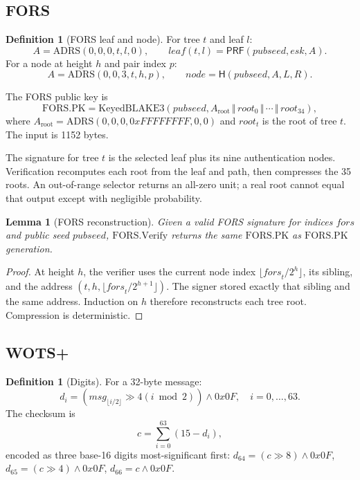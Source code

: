 \documentclass[11pt,a4paper]{article}
\theoremstyle{plain}
\newtheorem{lemma}[theorem]{Lemma}
\theoremstyle{definition}
\newtheorem{definition}[theorem]{Definition}
\theoremstyle{remark}
\newcommand{\concat}{\,\Vert\,}
\newcommand{\Hash}{\mathsf{H}}
\newcommand{\PRF}{\mathsf{PRF}}
\begin{document}
\subsection{FORS}

\begin{definition}[FORS leaf and node]
For tree $t$ and leaf $l$:
\[
 A=\mathrm{ADRS}(0,0,0,t,l,0),\qquad
 \mathit{leaf}(t,l)=\PRF(\mathit{pubseed},\mathit{esk},A).
\]
For a node at height $h$ and pair index $p$:
\[
 A=\mathrm{ADRS}(0,0,3,t,h,p),\qquad
 \mathit{node}=\Hash(\mathit{pubseed},A,L,R).
\]
\end{definition}

The FORS public key is
\[
 \mathrm{FORS.PK}=\mathrm{KeyedBLAKE3}(\mathit{pubseed},
 A_{\mathrm{root}}\concat\mathit{root}_0\concat\cdots
 \concat\mathit{root}_{34}),
\]
where $A_{\mathrm{root}}=\mathrm{ADRS}(0,0,0,0xFFFFFFFF,0,0)$ and
$\mathit{root}_t$ is the root of tree $t$.  The input is 1152 bytes.

The signature for tree $t$ is the selected leaf plus its nine
authentication nodes.  Verification recomputes each root from the leaf
and path, then compresses the 35 roots.  An out-of-range selector
returns an all-zero unit; a real root cannot equal that output except
with negligible probability.

\begin{lemma}[FORS reconstruction]
\label{lem:fors}
Given a valid FORS signature for indices $\mathit{fors}$ and public
seed $\mathit{pubseed}$, $\mathrm{FORS.Verify}$ returns the same
$\mathrm{FORS.PK}$ as $\mathrm{FORS.PK}$ generation.
\end{lemma}

\begin{proof}
At height $h$, the verifier uses the current node index
$\lfloor\mathit{fors}_t/2^h\rfloor$, its sibling, and the address
$(t,h,\lfloor\mathit{fors}_t/2^{h+1}\rfloor)$.  The signer stored
exactly that sibling and the same address.  Induction on $h$ therefore
reconstructs each tree root.  Compression is deterministic.
\end{proof}

\subsection{WOTS+}

\begin{definition}[Digits]
For a 32-byte message:
\[
 d_i=(msg_{\lfloor i/2\rfloor}\gg4(i\bmod2))\land0x0F,
 \quad i=0,\ldots,63.
\]
The checksum is
\[
 c=\sum_{i=0}^{63}(15-d_i),
\]
encoded as three base-16 digits most-significant first:
$d_{64}=(c\gg8)\land0x0F$,
$d_{65}=(c\gg4)\land0x0F$,
$d_{66}=c\land0x0F$.
\end{definition}
\end{document}
